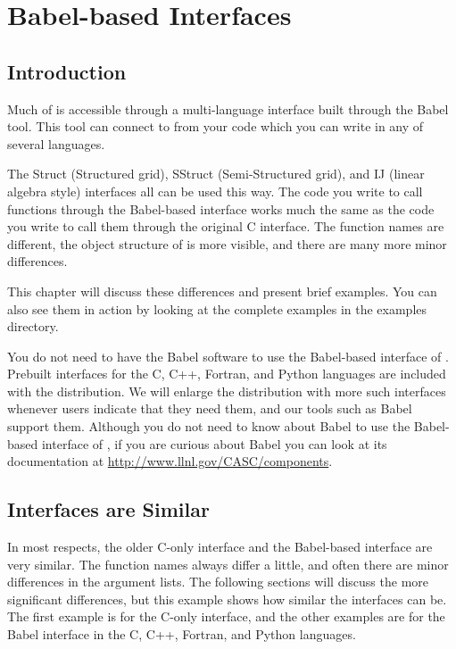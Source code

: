 
\chapter{Babel-based Interfaces}
\label{ch-babel}

\section{Introduction}

Much of \hypre{} is accessible through a multi-language interface
built through the Babel tool.  This tool can connect to \hypre{} from
your code which you can write in any of several languages.

The Struct (Structured grid), SStruct (Semi-Structured grid), and IJ
(linear algebra style) interfaces all can be used
this way.  The code you write to call \hypre{} functions through the
Babel-based interface works much the same as the code you write to
call them through the original C interface.  The function names are
different, the object structure of \hypre{} is more visible, and there
are many more minor differences.

This chapter will discuss these differences and present brief
examples.  You can also see them in action by looking at the complete
examples in the examples directory.

You do not need to have the Babel software to use the Babel-based
interface of \hypre{}.  Prebuilt interfaces for the C, C++, Fortran,
and Python languages are included with the \hypre{} distribution. We
will enlarge the distribution with more such interfaces whenever
\hypre{} users indicate that they need them, and our tools such as
Babel support them.  Although you do not need to know about Babel to
use the Babel-based interface of \hypre{}, if you are curious about
Babel you can look at its documentation at
\url{http://www.llnl.gov/CASC/components}.

\section{Interfaces are Similar}
\label{sec-Interfaces-Similar}

In most respects, the older C-only interface and the Babel-based
interface are very similar. The function names always differ a little,
and often there are minor differences in the argument lists.  The
following sections will discuss the more significant differences, but
this example shows how similar the interfaces can be.  The first
example is for the C-only interface, and the other examples are for
the Babel interface in the C, C++, Fortran, and Python languages.

